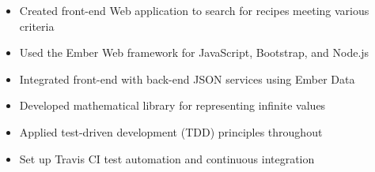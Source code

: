 \documentclass[10pt]{article}
\begin{document}

	\begin{itemize}[noitemsep,topsep=0.25em]
		\item Created front-end Web application to search for recipes meeting various criteria
		\item Used the Ember Web framework for JavaScript, Bootstrap, and Node.js
		\item Integrated front-end with back-end JSON services using Ember Data
	\end{itemize}


	\begin{itemize}[noitemsep,topsep=0.25em]
		\item Developed mathematical library for representing infinite values
		\item Applied test-driven development (TDD) principles throughout
		\item Set up Travis CI test automation and continuous integration
	\end{itemize}
\end{document}
